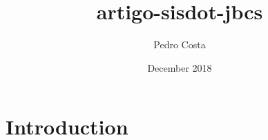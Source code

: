 \documentclass{article}
\title{artigo-sisdot-jbcs}
\author{Pedro Costa}
\date{December 2018}
\begin{document}
\maketitle

\section{Introduction}
\end{document}
